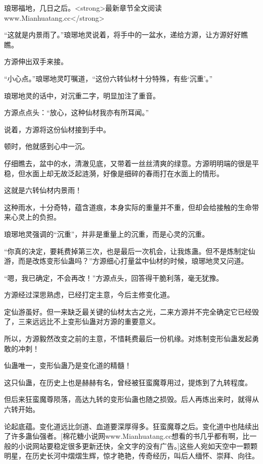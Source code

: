 
\begin{this_body}

琅琊福地，几日之后。<strong>最新章节全文阅读www.Mianhuatang.cc</strong>

“这就是内景雨了。”琅琊地灵说着，将手中的一盆水，递给方源，让方源好好瞧瞧。

方源伸出双手来接。

“小心点。”琅琊地灵叮嘱道，“这份六转仙材十分特殊，有些‘沉重’。”

琅琊地灵的话中，对沉重二字，明显加注了重音。

方源点点头：“放心，这种仙材我亦有所耳闻。”

说着，方源将这份仙材接到手中。

顿时，他就感到心中一沉。

仔细瞧去，盆中的水，清澈见底，又带着一丝丝清爽的绿意。方源明明端的很是平稳，但水面上却无故泛起涟漪，好像是细碎的春雨打在水面上的情形。

这就是六转仙材内景雨！

这种雨水，十分奇特，蕴含道痕，本身实际的重量并不重，但却会给接触的生命带来心灵上的负担。

琅琊地灵强调的“沉重”，并非是重量上的沉重，而是心灵的沉重。

“你真的决定，要耗费掉第三次，也是最后一次机会，让我炼蛊。但不是炼制定仙游，而是改炼变形仙蛊吗？”方源细心打量盆中仙材的时候，琅琊地灵又问道。

“嗯，我已确定，不会再改！”方源点头，回答得干脆利落，毫无犹豫。

方源经过深思熟虑，已经打定主意，今后主修变化道。

定仙游虽好。但一来缺乏最关键的仙材太古之光，二来方源并不完全确定它已经毁了，三来远远比不上变形仙蛊对方源的重要意义。

所以，方源毅然改变之前的主意，不惜耗费最后一份机缘。对炼制变形仙蛊发起勇敢的冲刺！

仙蛊唯一，变形仙蛊乃是变化道的精髓！

这只仙蛊，在历史上也是赫赫有名，曾经被狂蛮魔尊用过，提炼到了九转程度。

但后来狂蛮魔尊陨落，高达九转的变形仙蛊也随之损毁。后人再炼出来时，就得从六转开始。

论起底蕴。变化道远比剑道、血道要深厚得多。狂蛮魔尊之后。变化道中也陆续出了许多蛊仙强者。[棉花糖小说网www.Mianhuatang.cc想看的书几乎都有啊，比一般的小说网站要稳定很多更新还快，全文字的没有广告。]这些人宛如天空中一颗颗明星，在历史长河中熠熠生辉，惊才艳艳，传奇经历，叫后人缅怀、崇拜、向往。


\end{this_body}
